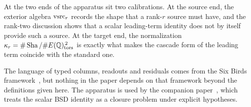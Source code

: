 At the two ends of the apparatus sit two calibrations.  At the source end,
the exterior algebra $\mathrm{vsrc}_r$ records the shape that a rank-$r$ source
must have, and the rank-two discussion shows that a scalar leading-term
identity does not by itself provide such a source.  At the target end,
the normalization $\kappa_r=\#\operatorname{Sha}/\#E(\mathbb{Q})_{\operatorname{tors}}^{\,2}$ is exactly what
makes the cascade form of the leading term coincide with the standard
one.

The language of typed columns, readouts and residuals comes from the Six
Birds framework~\citep{TsiokosNeedles2026,TsiokosFoundationsII2026,TsiokosFoundationsIII2026},
but nothing in the paper depends on that framework beyond the definitions
given here.  The apparatus is used by the companion
paper~\citep{TsiokosBSDClosure2026}, which treats the scalar BSD identity
as a closure problem under explicit hypotheses.
